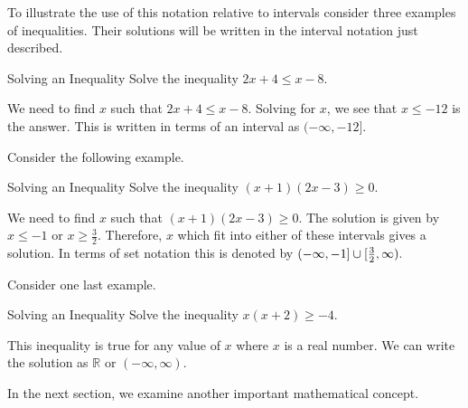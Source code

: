 To illustrate the use of this notation relative to intervals consider three
examples of inequalities. Their solutions will be written in the interval notation
just described.

\begin{example}{Solving an Inequality}\label{exa:solvinginequality1}
Solve the inequality $2x+4\leq x-8$.
\end{example}

\begin{solution}
We need to find $x$ such that $2x+4\leq x-8$. Solving for $x$, we see that 
$x\leq -12$ is the answer. This is written in terms of an interval as $(-\infty ,-12].$
\end{solution}

Consider the following example.

\begin{example}{Solving an Inequality}\label{exa:solvinginequality2}
Solve the inequality $\left( x+1\right) \left( 2x-3\right) \geq0.$
\end{example}

\begin{solution}
We need to find $x$ such that $\left( x+1\right) \left( 2x-3\right) \geq0.$ 
The solution is given by  $x\leq -1$ or $x\geq \frac{3}{2}$. Therefore, 
$x$ which fit into either of these intervals gives a solution. In terms of set notation this is denoted by $(-\infty ,-1]\cup
[ \vspace{0.05in}\frac{3}{2},\infty ).$
\end{solution}

Consider one last example.

\begin{example}{Solving an Inequality}\label{exa:solvinginequality3}
Solve the inequality $x \left( x+2\right) \geq-4$.
\end{example}

\begin{solution}
This inequality is true for any value of $x$ where $x$ is a real number. We can write the solution as $\mathbb{R}$ or $\left(
-\infty ,\infty \right) .$
\end{solution}

In the next section, we examine another important mathematical concept.
